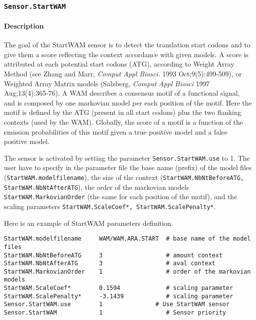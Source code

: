 
\subsubsection{\texttt{Sensor.StartWAM}}

\paragraph{Description}

The goal of the StartWAM sensor is to detect the translation start
codons and to give them a score reflecting the context accordance with
given models. A score is attributed at each potential start codons
(ATG), according to Weight Array Method (see Zhang and Marr, {\em
  Comput Appl Biosci.} 1993 Oct;9(5):499-509), or Weighted Array
Matrix models (Salzberg, {\em Comput Appl Biosci} 1997
Aug;13(4):365-76). A WAM describes a consensus motif of a functional
signal, and is composed by one markovian model per each position of
the motif. Here the motif is defined by the ATG (present in all start
codons) plus the two flanking contexts (used by the WAM).  Globally,
the score of a motif is a function of the emission probabilities of
this motif given a true positive model and a false positive model.

The sensor is activated by setting the parameter
\texttt{Sensor.StartWAM.use} to 1.  The user have to specify in
the parameter file the base name (prefix) of the model files
(\texttt{StartWAM.modelfilename}), the size of the context
(\texttt{StartWAM.NbNtBeforeATG, StartWAM.NbNtAfterATG}), the order of
the markovian models \texttt{StartWAM.MarkovianOrder} (the same for
each position of the motif), and the scaling parameters
\texttt{StartWAM.ScaleCoef*, StartWAM.ScalePenalty*}.

Here is an example of StartWAM parameters definition.
\begin{Verbatim}[fontsize=\small]
StartWAM.modelfilename     WAM/WAM.ARA.START  # base name of the model files
StartWAM.NbNtBeforeATG     3                  # amount context
StartWAM.NbNtAfterATG      3                  # aval context
StartWAM.MarkovianOrder    1                  # order of the markovian models
StartWAM.ScaleCoef*        0.1594             # scaling parameter
StartWAM.ScalePenalty*     -3.1439            # scaling parameter
Sensor.StartWAM.use        1               # Use StartWAM sensor
Sensor.StartWAM            1                  # Sensor priority
\end{Verbatim}

